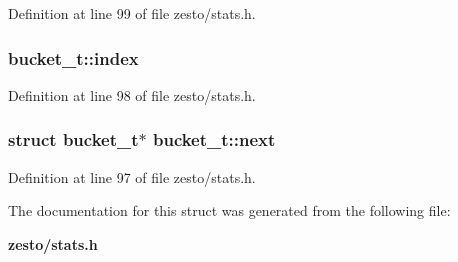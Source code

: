 Definition at line 99 of file zesto/stats.h.
\subsubsection[{index}]{ {\bf bucket\_\-t::index}}\label{structbucket__t_73ae46066728a586dc5ac55431da1d9e}




Definition at line 98 of file zesto/stats.h.
\subsubsection[{next}]{\setlength{\rightskip}{0pt plus 5cm}struct {\bf bucket\_\-t}$\ast$ {\bf bucket\_\-t::next}\hspace{0.3cm}{\tt  [read]}}\label{structbucket__t_2c556ac0cf0d2de0d34dec2da5283b98}




Definition at line 97 of file zesto/stats.h.

The documentation for this struct was generated from the following file:\begin{CompactItemize}
\item 
{\bf zesto/stats.h}\end{CompactItemize}
